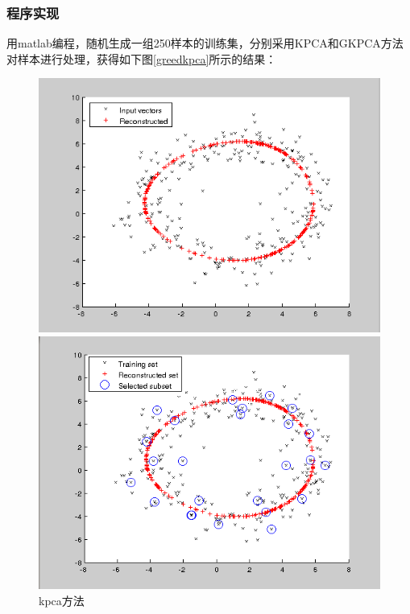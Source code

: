 \documentclass[10pt,a4paper]{article}
\begin{document}
\begin{CJK*}{UTF8}{song}
\subsubsection{程序实现}
用matlab编程，随机生成一组250样本的训练集，分别采用KPCA和GKPCA方法对样本进行处理，获得如下图\ref{greedkpca}所示的结果：
\begin{figure}[!htbp]
  \begin{minipage}[t]{0.48\linewidth}
    \centering
    \includegraphics[width=\textwidth]{figs/kpca.png}
    \caption{kpca方法\label{kpca}}
  \end{minipage}
  \hfill
  \begin{minipage}[t]{0.48\linewidth}
    \centering
    \includegraphics[width=\textwidth]{figs/gkpca.png}

\end{minipage}
\end{figure}
\end{CJK*}
\end{document}
